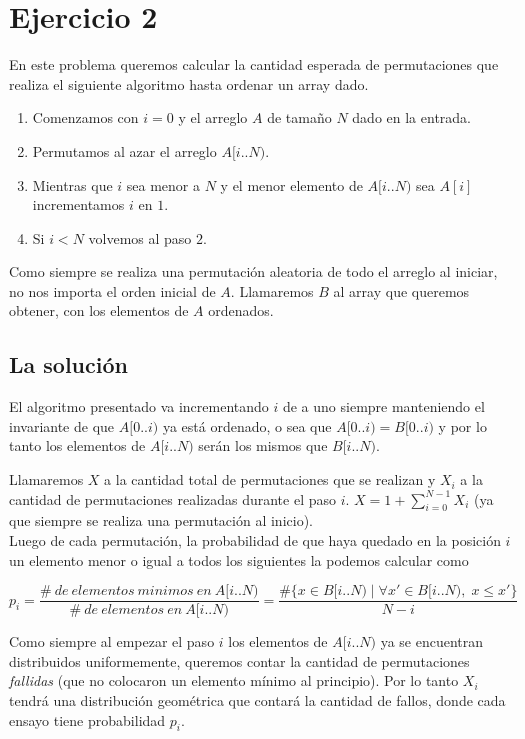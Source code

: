 \section{Ejercicio 2}

En este problema queremos calcular la cantidad esperada de permutaciones que realiza el siguiente algoritmo
hasta ordenar un array dado.

\begin{enumerate}
    \item Comenzamos con $i = 0$ y el arreglo $A$ de tamaño $N$ dado en la entrada.

    \item Permutamos al azar el arreglo $A[i..N)$.

    \item Mientras que $i$ sea menor a $N$ y el menor elemento de $A[i..N)$
            sea $A[i]$ incrementamos $i$ en $1$.

    \item Si $i < N$ volvemos al paso $2$.
\end{enumerate}

Como siempre se realiza una permutación aleatoria de todo el arreglo al iniciar,
no nos importa el orden inicial de $A$.
Llamaremos $B$ al array que queremos obtener, con los elementos de $A$ ordenados.

\subsection{La solución}

El algoritmo presentado va incrementando $i$ de a uno siempre manteniendo el invariante
de que $A[0..i)$ ya está ordenado, o sea que $A[0..i) = B[0..i)$ y por lo tanto
los elementos de $A[i..N)$ serán los mismos que $B[i..N)$.

Llamaremos $X$ a la cantidad total de permutaciones que se realizan y
$X_i$ a la cantidad de permutaciones realizadas durante el paso $i$.
$X = 1 + \sum_{i=0}^{N-1} X_i$ (ya que siempre se realiza una permutación al inicio).
\\

Luego de cada permutación, la probabilidad de que haya quedado en la posición $i$ un elemento
menor o igual a todos los siguientes la podemos calcular como

$$
p_i =
\frac{\#\ de\ elementos\ minimos\ en\ A[i..N)}{\#\ de\ elementos\ en\ A[i..N)} =
\frac{\#\{x \in B[i..N) \;|\; \forall x' \in B[i..N), \; x \leq x' \}}{N - i}
$$

Como siempre al empezar el paso $i$ los elementos de $A[i..N)$ ya se encuentran distribuidos uniformemente,
queremos contar la cantidad de permutaciones \textit{fallidas} (que no colocaron un elemento mínimo al principio). Por lo tanto $X_i$ tendrá una distribución geométrica que contará la cantidad de fallos,
donde cada ensayo tiene probabilidad $p_i$.

